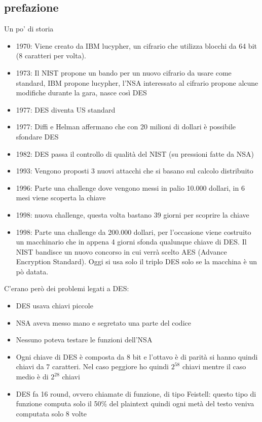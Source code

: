 \documentclass[10pt,a4paper]{article}
\begin{document}
\subsection{prefazione}
Un po' di storia
\begin{itemize}
\item 1970: Viene creato da IBM lucypher, un cifrario che utilizza blocchi da 64 bit (8 caratteri per volta).
\item 1973: Il NIST propone un bando per un nuovo cifrario da usare come standard, IBM propone lucypher, l'NSA interessato al cifrario propone alcune modifiche durante la gara, nasce così DES
\item 1977: DES diventa US standard
\item 1977: Diffi e Helman affermano che con 20 milioni di dollari è possibile sfondare DES
\item 1982: DES passa il controllo di qualità del NIST (su pressioni fatte da NSA)
\item 1993: Vengono proposti 3 nuovi attacchi che si basano sul calcolo distribuito
\item 1996: Parte una challenge dove vengono messi in palio 10.000 dollari, in 6 mesi viene scoperta la chiave
\item 1998: nuova challenge, questa volta bastano 39 giorni per scoprire la chiave
\item 1998: Parte una challenge da 200.000 dollari, per l'occasione viene costruito un macchinario che in appena 4 giorni sfonda qualunque chiave di DES. Il NIST bandisce un nuovo concorso in cui verrà scelto AES (Advance Encryption Standard). Oggi si usa solo il triplo DES solo se la macchina è un pò datata.

\end{itemize}

C'erano però dei problemi legati a DES:
\begin{itemize}
\item DES usava chiavi piccole
\item NSA aveva messo mano e segretato una parte del codice
\item Nessuno poteva testare le funzioni dell'NSA
\item Ogni chiave di DES è composta da 8 bit e l'ottavo è di parità si hanno quindi chiavi da 7 caratteri. Nel caso peggiore ho quindi $2^58$ chiavi mentre il caso medio è di $2^28$ chiavi
\item DES fa 16 round, ovvero chiamate di funzione, di tipo Feistell: questo tipo di funzione computa solo il 50\% del plaintext quindi ogni metà del testo veniva computata solo 8 volte
\end{itemize}
\end{document}
